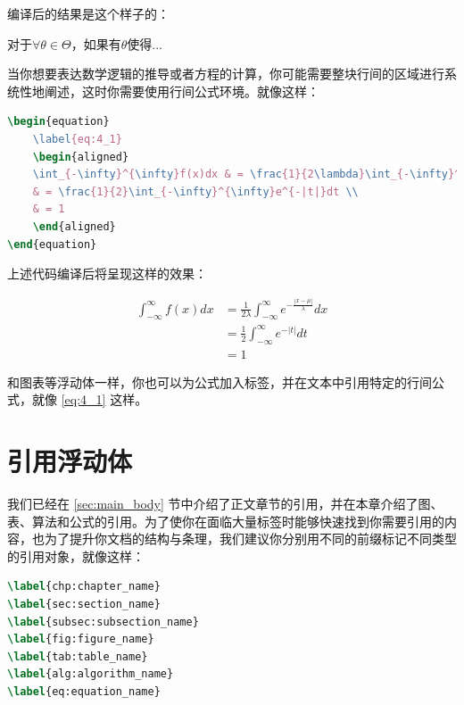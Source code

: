 \noindent 编译后的结果是这个样子的：

对于$\forall \theta \in \Theta$，如果有$\theta$使得...

当你想要表达数学逻辑的推导或者方程的计算，你可能需要整块行间的区域进行系统性地阐述，这时你需要使用行间公式环境。就像这样：

\begin{tcolorbox}
\begin{lstlisting}[language=TeX]
\begin{equation}
    \label{eq:4_1}
    \begin{aligned}
    \int_{-\infty}^{\infty}f(x)dx & = \frac{1}{2\lambda}\int_{-\infty}^{\infty}e^{-\frac{|x-\mu|}{\lambda}}dx \\
    & = \frac{1}{2}\int_{-\infty}^{\infty}e^{-|t|}dt \\
    & = 1
    \end{aligned}
\end{equation}
\end{lstlisting}
\end{tcolorbox}

\noindent 上述代码编译后将呈现这样的效果：

\begin{equation}
    \label{eq:4_1}
    \begin{aligned}
    \int_{-\infty}^{\infty}f(x)dx & = \frac{1}{2\lambda}\int_{-\infty}^{\infty}e^{-\frac{|x-\mu|}{\lambda}}dx \\
    & = \frac{1}{2}\int_{-\infty}^{\infty}e^{-|t|}dt \\
    & = 1
    \end{aligned}
\end{equation}

和图表等浮动体一样，你也可以为公式加入标签，并在文本中引用特定的行间公式，就像 \ref{eq:4_1} 这样。

\section{引用浮动体}

我们已经在 \ref{sec:main_body} 节中介绍了正文章节的引用，并在本章介绍了图、表、算法和公式的引用。为了使你在面临大量标签时能够快速找到你需要引用的内容，也为了提升你文档的结构与条理，我们建议你分别用不同的前缀标记不同类型的引用对象，就像这样：

\begin{tcolorbox}
\begin{lstlisting}[language=TeX]
\label{chp:chapter_name}
\label{sec:section_name}
\label{subsec:subsection_name}
\label{fig:figure_name}
\label{tab:table_name}
\label{alg:algorithm_name}
\label{eq:equation_name}
\end{lstlisting}
\end{tcolorbox}

